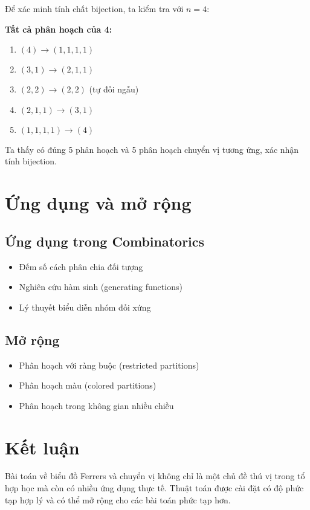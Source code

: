 \documentclass[12pt,a4paper]{article}
\theoremstyle{definition}
\begin{document}
Để xác minh tính chất bijection, ta kiểm tra với $n = 4$:

\textbf{Tất cả phân hoạch của 4:}
\begin{enumerate}
\item $(4) \rightarrow (1,1,1,1)$
\item $(3,1) \rightarrow (2,1,1)$  
\item $(2,2) \rightarrow (2,2)$ (tự đối ngẫu)
\item $(2,1,1) \rightarrow (3,1)$
\item $(1,1,1,1) \rightarrow (4)$
\end{enumerate}

Ta thấy có đúng 5 phân hoạch và 5 phân hoạch chuyển vị tương ứng, xác nhận tính bijection.

\section{Ứng dụng và mở rộng}

\subsection{Ứng dụng trong Combinatorics}
\begin{itemize}
\item Đếm số cách phân chia đối tượng
\item Nghiên cứu hàm sinh (generating functions)
\item Lý thuyết biểu diễn nhóm đối xứng
\end{itemize}

\subsection{Mở rộng}
\begin{itemize}
\item Phân hoạch với ràng buộc (restricted partitions)
\item Phân hoạch màu (colored partitions) 
\item Phân hoạch trong không gian nhiều chiều
\end{itemize}

\section{Kết luận}

Bài toán về biểu đồ Ferrers và chuyển vị không chỉ là một chủ đề thú vị trong tổ hợp học mà còn có nhiều ứng dụng thực tế. Thuật toán được cài đặt có độ phức tạp hợp lý và có thể mở rộng cho các bài toán phức tạp hơn.
\end{document}
